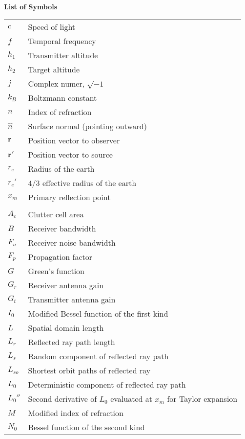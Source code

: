 \noindent\Large{\bf{List of Symbols}}

\vspace{24pt}

\small\normalsize
\begin{supertabular}{ll}
$c$ & Speed of light \\
$f$ & Temporal frequency \\
$h_1$ & Transmitter altitude\\
$h_2$ & Target altitude \\
$j$ & Complex numer, $\sqrt{-1}$ \\
$k_B$ & Boltzmann constant \\
$n$ & Index of refraction \\
$\hat{n}$ & Surface normal (pointing outward) \\
$\mathbf{r}$ & Position vector to observer \\
$\mathbf{r}'$ & Position vector to source \\
$r_e$ & Radius of the earth \\
$r_e'$ & 4/3 effective radius of the earth \\
$x_m$ & Primary reflection point \\
\\
$A_c $ & Clutter cell area \\
$B$ & Receiver bandwidth \\
$F_n$ & Receiver noise bandwidth \\
$F_p$ & Propagation factor \\
$G$ & Green's function \\
$G_r$ & Receiver antenna gain \\
$G_t$ & Transmitter antenna gain \\
$I_0$ & Modified Bessel function of the first kind \\
$L$ & Spatial domain length \\
$L_r$ & Reflected ray path length \\
$L_s$ & Random component of reflected ray path \\
$L_{so}$ & Shortest orbit paths of reflected ray \\
$L_0$ & Deterministic component of reflected ray path \\
$L_0''$ & Second derivative of $L_0$ evaluated at $x_m$ for Taylor expansion\\
$M$ & Modified index of refraction \\
$N_0$ & Bessel function of the second kind \\

\end{supertabular}
